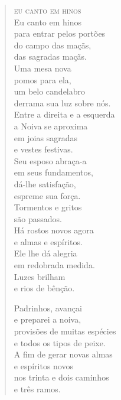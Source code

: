 \vspace*{1cm}

\begin{verse}
\textsc{eu canto em hinos}\\[15pt]

Eu canto em hinos\\
para entrar pelos portões\\
do campo das maçãs,\\
das sagradas maçãs.\\[5pt]

Uma mesa nova\\
pomos para ela,\\
um belo candelabro\\
derrama sua luz sobre nós.\\[5pt]

Entre a direita e a esquerda\\
a Noiva se aproxima\\
em joias sagradas\\
e vestes festivas.\\[5pt]

Seu esposo abraça-a\\
em seus fundamentos,\\
dá-lhe satisfação,\\
espreme sua força.\\[5pt]

Tormentos e gritos\\
são passados.\\
Há rostos novos agora\\
e almas e espíritos.\\[5pt]

Ele lhe dá alegria\\
em redobrada medida.\\
Luzes brilham\\
e rios de bênção.\\[5pt]

\pagebreak

Padrinhos, avançai\\
e preparei a noiva,\\
provisões de muitas espécies\\
e todos os tipos de peixe.\\[5pt]

A fim de gerar novas almas\\
e espíritos novos\\
nos trinta e dois caminhos\\
e três ramos.\\[5pt]


\end{verse}
